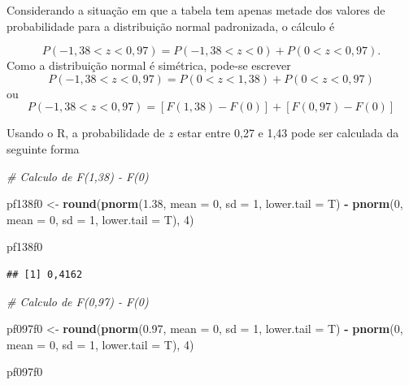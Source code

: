 \documentclass[
]{book}
\newenvironment{Shaded}{\begin{snugshade}}{\end{snugshade}}
\newcommand{\CommentTok}[1]{\textcolor[rgb]{0.56,0.35,0.01}{\textit{#1}}}
\newcommand{\DataTypeTok}[1]{\textcolor[rgb]{0.13,0.29,0.53}{#1}}
\newcommand{\DecValTok}[1]{\textcolor[rgb]{0.00,0.00,0.81}{#1}}
\newcommand{\FloatTok}[1]{\textcolor[rgb]{0.00,0.00,0.81}{#1}}
\newcommand{\KeywordTok}[1]{\textcolor[rgb]{0.13,0.29,0.53}{\textbf{#1}}}
\newcommand{\NormalTok}[1]{#1}
\newcommand{\OperatorTok}[1]{\textcolor[rgb]{0.81,0.36,0.00}{\textbf{#1}}}
\newcommand{\StringTok}[1]{\textcolor[rgb]{0.31,0.60,0.02}{#1}}
\begin{document}
Considerando a situação em que a tabela tem apenas metade dos valores de probabilidade para a distribuição normal padronizada, o cálculo é

\[
  P( -1,38 < z < 0,97) = P (-1,38 < z < 0) + P(0 < z < 0,97).
\]
Como a distribuição normal é simétrica, pode-se escrever
\[
  P( -1,38 < z < 0,97) = P (0 < z < 1,38) + P(0 < z < 0,97)
\]
ou
\[
  P( -1,38 < z < 0,97) = [F(1,38) - F(0)] +[F(0,97) - F(0)]
\]

Usando o R, a probabilidade de \(z\) estar entre 0,27 e 1,43 pode ser calculada da seguinte forma

\begin{Shaded}
\begin{Highlighting}[]
\CommentTok{# Calculo de F(1,38) - F(0)}

\NormalTok{pf138f0 <-}\StringTok{ }\KeywordTok{round}\NormalTok{(}\KeywordTok{pnorm}\NormalTok{(}\FloatTok{1.38}\NormalTok{, }\DataTypeTok{mean =} \DecValTok{0}\NormalTok{, }\DataTypeTok{sd =} \DecValTok{1}\NormalTok{, }\DataTypeTok{lower.tail =}\NormalTok{ T) }\OperatorTok{-}\StringTok{ }
\StringTok{    }\KeywordTok{pnorm}\NormalTok{(}\DecValTok{0}\NormalTok{, }\DataTypeTok{mean =} \DecValTok{0}\NormalTok{, }\DataTypeTok{sd =} \DecValTok{1}\NormalTok{, }\DataTypeTok{lower.tail =}\NormalTok{ T), }\DecValTok{4}\NormalTok{)}

\NormalTok{pf138f0}
\end{Highlighting}
\end{Shaded}

\begin{verbatim}
## [1] 0,4162
\end{verbatim}

\begin{Shaded}
\begin{Highlighting}[]
\CommentTok{# Calculo de F(0,97) - F(0)}

\NormalTok{pf097f0 <-}\StringTok{ }\KeywordTok{round}\NormalTok{(}\KeywordTok{pnorm}\NormalTok{(}\FloatTok{0.97}\NormalTok{, }\DataTypeTok{mean =} \DecValTok{0}\NormalTok{, }\DataTypeTok{sd =} \DecValTok{1}\NormalTok{, }\DataTypeTok{lower.tail =}\NormalTok{ T) }\OperatorTok{-}\StringTok{ }
\StringTok{    }\KeywordTok{pnorm}\NormalTok{(}\DecValTok{0}\NormalTok{, }\DataTypeTok{mean =} \DecValTok{0}\NormalTok{, }\DataTypeTok{sd =} \DecValTok{1}\NormalTok{, }\DataTypeTok{lower.tail =}\NormalTok{ T), }\DecValTok{4}\NormalTok{)}

\NormalTok{pf097f0}
\end{Highlighting}
\end{Shaded}
\end{document}
